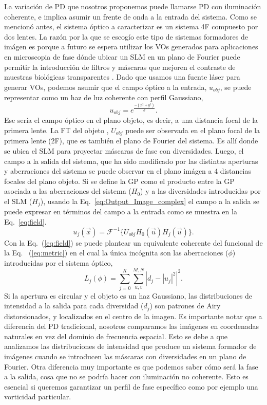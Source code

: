 La variación de PD que nosotros proponemos puede llamarse PD con
iluminación coherente, e implica asumir un frente de onda a la entrada
del sistema. 
Como se mencionó antes, el sistema óptico a caracterizar es un sistema
4F compuesto por dos lentes. La razón por la que se escogío este tipo
de sistemas formadores de imágen es porque a futuro se espera utilizar
los VOs generados para aplicaciones en microscopia de fase dónde
ubicar un SLM en un plano de Fourier puede permitir la introducción de
filtros y máscaras que mejoren el contraste de muestras biológicas transparentes
. 
Dado que usamos  una fuente láser para generar VOs, podemos asumir que el campo óptico a la entrada, $u_{obj}$, se puede representar
como un haz de luz coherente con perfil Gaussiano,
$$u_{obj} = e^{\frac{-(x^2+y^2)}{\sigma}}.$$
 Ese sería el campo óptico en el plano objeto, es decir, a una
 distancia focal de la primera lente. La FT del 
 objeto , $U_{obj}$ puede ser
 observada en el plano focal de la
 primera lente (2F), que es también el plano de Fourier del
 sistema. Es allí donde se ubica el SLM para proyectar máscaras de
 fase con diversidades. Luego, el campo a la salida del sistema, que
 ha sido modificado por las distintas aperturas y aberraciones del sistema se puede
 observar en el plano imágen a 4 distancias 
 focales del plano objeto. Si se define la GP como el producto entre
 la GP asociada a las aberraciones del sistema ($H_0$) y a las diversidades
 introducidas por el SLM ($H_j$), usando la Eq.~\ref{eq:Output_Image_complex} el
 campo a la salida se puede expresar en términos del campo a la
 entrada como se muestra en la Eq.~\ref{eq:field}.
\begin{equation}\label{eq:field}
u_{j}(\vec{x}) = \mathcal{F}^{- 1}\{ U_{obj} H_0(\vec{u}) H_j(\vec{u}) \}.
\end{equation} 
Con la Eq.~(\ref{eq:field}) se puede plantear un equivalente coherente del
funcional de la Eq.~ (\ref{eq:metric}) en el cual la única incógnita son las
aberraciones ($\phi$) introducidas por el sistema óptico,
\begin{equation}
L_j(\phi)= \sum_{j=0}^{K} \sum_{u,v}^{M,N}  \left |d_{j} - |u_j|^2
\right | ^2.
\label{eq:metric_coherent}
\end{equation}
Si la apertura es circular y el objeto es un haz Gaussiano, las
distribuciones de intensidad a la salida para cada diversidad
($d_{j}$) son patrones de Airy distorsionados, y localizados en el centro de la imagen.  
Es importante notar que a diferencia del PD tradicional, nosotros
comparamos las imágenes en coordenadas naturales en vez del dominio de
frecuencia espacial. Esto se debe a que analizamos las distribuciones
de intensidad que
produce un sistema formador de
imágenes cuando se introducen las máscaras con diversidades en un
plano de Fourier. Otra diferencia muy importante es que podemos saber
cómo será la fase a la salida, cosa que no se podría hacer con
iluminación no coherente. Esto es esencial si queremos garantizar un
perfil de fase específico como por ejemplo una vorticidad particular. 

